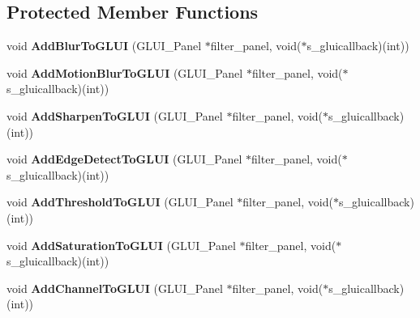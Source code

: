 \subsection*{Protected Member Functions}
\begin{DoxyCompactItemize}
\item 
void {\bfseries Add\+Blur\+To\+G\+L\+UI} (G\+L\+U\+I\+\_\+\+Panel $\ast$filter\+\_\+panel, void($\ast$s\+\_\+gluicallback)(int))\hypertarget{classimage__tools_1_1FilterManager_ae85ce9fc1146be4b403187064bb7cd97}{}\label{classimage__tools_1_1FilterManager_ae85ce9fc1146be4b403187064bb7cd97}

\item 
void {\bfseries Add\+Motion\+Blur\+To\+G\+L\+UI} (G\+L\+U\+I\+\_\+\+Panel $\ast$filter\+\_\+panel, void($\ast$s\+\_\+gluicallback)(int))\hypertarget{classimage__tools_1_1FilterManager_a023cb6f79a31c7635c73aed94ad8f684}{}\label{classimage__tools_1_1FilterManager_a023cb6f79a31c7635c73aed94ad8f684}

\item 
void {\bfseries Add\+Sharpen\+To\+G\+L\+UI} (G\+L\+U\+I\+\_\+\+Panel $\ast$filter\+\_\+panel, void($\ast$s\+\_\+gluicallback)(int))\hypertarget{classimage__tools_1_1FilterManager_aaeaa991e824af5651604240bf6841f4d}{}\label{classimage__tools_1_1FilterManager_aaeaa991e824af5651604240bf6841f4d}

\item 
void {\bfseries Add\+Edge\+Detect\+To\+G\+L\+UI} (G\+L\+U\+I\+\_\+\+Panel $\ast$filter\+\_\+panel, void($\ast$s\+\_\+gluicallback)(int))\hypertarget{classimage__tools_1_1FilterManager_a8ea1737814292a8248e87f68772bba84}{}\label{classimage__tools_1_1FilterManager_a8ea1737814292a8248e87f68772bba84}

\item 
void {\bfseries Add\+Threshold\+To\+G\+L\+UI} (G\+L\+U\+I\+\_\+\+Panel $\ast$filter\+\_\+panel, void($\ast$s\+\_\+gluicallback)(int))\hypertarget{classimage__tools_1_1FilterManager_a7886a22bba28b6a4d47e4da8dcf6e500}{}\label{classimage__tools_1_1FilterManager_a7886a22bba28b6a4d47e4da8dcf6e500}

\item 
void {\bfseries Add\+Saturation\+To\+G\+L\+UI} (G\+L\+U\+I\+\_\+\+Panel $\ast$filter\+\_\+panel, void($\ast$s\+\_\+gluicallback)(int))\hypertarget{classimage__tools_1_1FilterManager_a7d6d4cefdcf8cf23ae5467ed220d8ffe}{}\label{classimage__tools_1_1FilterManager_a7d6d4cefdcf8cf23ae5467ed220d8ffe}

\item 
void {\bfseries Add\+Channel\+To\+G\+L\+UI} (G\+L\+U\+I\+\_\+\+Panel $\ast$filter\+\_\+panel, void($\ast$s\+\_\+gluicallback)(int))\hypertarget{classimage__tools_1_1FilterManager_afe7ab6a2f6de62dc1b3b4c1d4350ddbe}{}\label{classimage__tools_1_1FilterManager_afe7ab6a2f6de62dc1b3b4c1d4350ddbe}


\end{DoxyCompactItemize}
